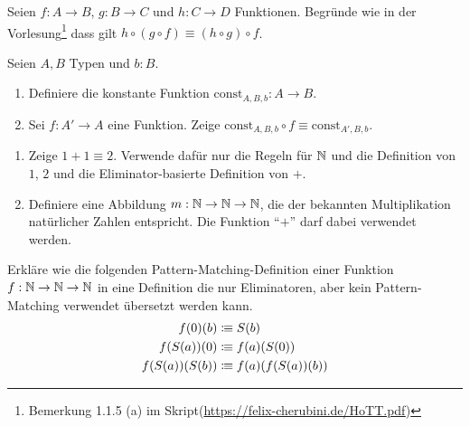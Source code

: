 \documentclass{hott-übung}
\begin{document}
\setcounter{blattnummer}{1}
\setcounter{aufgabennummer}{0}

\blatt

  Seien $f:A\to B$, $g:B\to C$ und $h:C\to D$ Funktionen.
  Begründe wie in der Vorlesung\footnote{Bemerkung 1.1.5 (a) im Skript(\url{https://felix-cherubini.de/HoTT.pdf})} dass gilt $h\circ(g\circ f)\equiv (h\circ g)\circ f$.

  Seien $A,B$ Typen und $b:B$.
  \begin{enumerate}
    \item Definiere die konstante Funktion $\mathrm{const}_{A,B,b}:A\to B$.
    \item Sei $f:A'\to A$ eine Funktion.
      Zeige $\mathrm{const}_{A,B,b}\circ f \equiv \mathrm{const}_{A',B,b}$.
  \end{enumerate}

\aufgabe{}
\begin{enumerate}
\item Zeige $1+1\equiv 2$. Verwende dafür nur die Regeln für $\mathbb{N}$ und die Definition von $1$, $2$ und die Eliminator-basierte Definition von $+$.
\item Definiere eine Abbildung $m:\mathbb{N}\to\mathbb{N}\to\mathbb{N}$, die der bekannten Multiplikation natürlicher Zahlen entspricht. Die Funktion ``$+$'' darf dabei verwendet werden.
\end{enumerate}
  
  Erkläre wie die folgenden Pattern-Matching-Definition einer Funktion $f:\mathbb{N}\to\mathbb{N}\to\mathbb{N}$ in eine
  Definition die nur Eliminatoren, aber kein Pattern-Matching verwendet übersetzt werden kann.
  \begin{align*}
    f(0)(b) &\vcentcolon\mspace{-1.2mu}\equiv S(b) \\
    f(S(a))(0) &\vcentcolon\mspace{-1.2mu}\equiv f(a)(S(0)) \\
    f(S(a))(S(b)) &\vcentcolon\mspace{-1.2mu}\equiv f(a)(f(S(a))(b))
  \end{align*}
\end{document}

